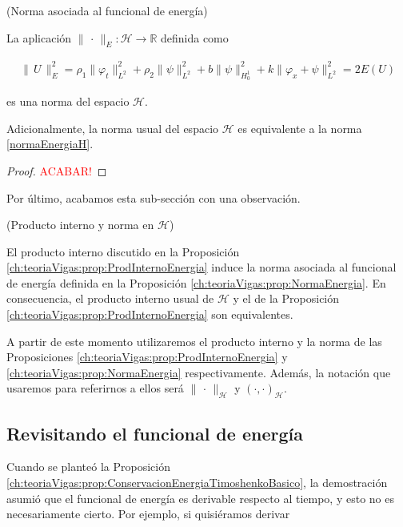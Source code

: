 \begin{Proposicion}{(Norma asociada al funcional de energía)}
    \label{ch:teoriaVigas:prop:NormaEnergia}

    La aplicación $\lVert \, \cdot \, \rVert_{E} : \mathcal{H} \rightarrow \mathbb{R}$ definida como

    \begin{align}
        \label{normaEnergiaH}
        \lVert \, U \, \rVert^2_{E} = \rho_1 \lVert \varphi_t \rVert^2_{L^2} + \rho_2 \lVert \psi \rVert_{L^2}^2 + b \lVert \psi \rVert_{H_0^1}^2 + k \lVert \varphi_x + \psi \rVert_{L^2}^2 = 2E(U)
    \end{align}
    
    es una norma del espacio $\mathcal{H}$.

    Adicionalmente, la norma usual del espacio $\mathcal{H}$ es equivalente a la norma \eqref{normaEnergiaH}.
\end{Proposicion}

\begin{proof}
    \textcolor{red}{ACABAR!}
\end{proof}

Por último, acabamos esta sub-sección con una observación.\\

\begin{Observacion}{(Producto interno y norma en $\mathcal{H}$)}
    \label{ch:teoriaVigas:obs:nuevaNorma}

    El producto interno discutido en la Proposición \eqref{ch:teoriaVigas:prop:ProdInternoEnergia} induce la norma asociada al funcional de energía definida en la Proposición \eqref{ch:teoriaVigas:prop:NormaEnergia}. En consecuencia, el producto interno usual de $\mathcal{H}$ y el de la Proposición \eqref{ch:teoriaVigas:prop:ProdInternoEnergia} son equivalentes.
\end{Observacion}

A partir de este momento utilizaremos el producto interno y la norma de las Proposiciones \eqref{ch:teoriaVigas:prop:ProdInternoEnergia} y \eqref{ch:teoriaVigas:prop:NormaEnergia} respectivamente. Además, la notación que usaremos para referirnos a ellos será $\lVert \, \cdot \, \rVert_{\mathcal{H}}$ y $(\cdot , \cdot)_{\mathcal{H}}$.

\subsection{Revisitando el funcional de energía}
\label{ch:teoriaVigas:section:timoshenkoFunc:subsection:energia}
Cuando se planteó la Proposición \eqref{ch:teoriaVigas:prop:ConservacionEnergiaTimoshenkoBasico}, la demostración asumió que el funcional de energía es derivable respecto al tiempo, y esto no es necesariamente cierto. Por ejemplo, si quisiéramos derivar 

